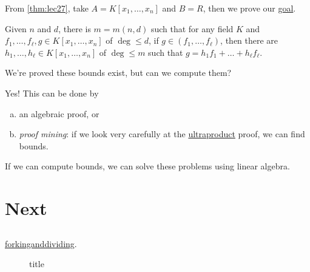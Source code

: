 From \autoref{thm:lec27}, take \(A = K[x_1, \dots , x_n]\) and \(B = R\), then we prove our \hyperref[prev:lec27-goal]{goal}.

\begin{theorem}
	Given \(n\) and \(d\), there is \(m = m(n, d)\) such that for any field \(K\) and \(f_1, \dots , f_{\ell }, g \in K[x_1, \dots , x_n]\) of \(\deg \leq d\), if \(g\in (f_1, \dots , f_{\ell } )\), then there are \(h_1, \dots , h_{\ell } \in K[x_1, \dots , x_n]\) of \(\deg \leq m\) such that \(g = h_1 f_1 + \dots + h_{\ell } f_{\ell } \).
\end{theorem}

\begin{problem*}
	We're proved these bounds exist, but can we compute them?
\end{problem*}
\begin{answer}
	Yes! This can be done by
	\begin{enumerate}[(a)]
		\item an algebraic proof, or
		\item \emph{proof mining}: if we look very carefully at the \hyperref[def:ultraproduct]{ultraproduct} proof, we can find bounds.
	\end{enumerate}
\end{answer}

\begin{remark}
	If we can compute bounds, we can solve these problems using linear algebra.
\end{remark}

\chapter{Next}

\section{}

\href{www.forkinganddividing.com}{forkinganddividing}.

\begin{figure}[H]
	\centering
	\caption{title}
	\label{fig:random-graph-QE}
\end{figure}